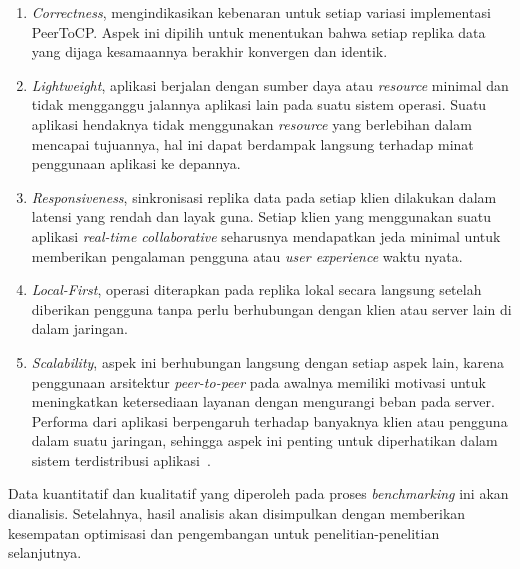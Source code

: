 \begin{enumerate}
    \item \textit{Correctness}, mengindikasikan kebenaran untuk setiap variasi implementasi PeerToCP. Aspek ini dipilih untuk menentukan bahwa setiap replika data yang dijaga kesamaannya berakhir konvergen dan identik.
    \item \textit{Lightweight}, aplikasi berjalan dengan sumber daya atau \textit{resource} minimal dan tidak mengganggu jalannya aplikasi lain pada suatu sistem operasi. Suatu aplikasi hendaknya tidak menggunakan \textit{resource} yang berlebihan dalam mencapai tujuannya, hal ini dapat berdampak langsung terhadap minat penggunaan aplikasi ke depannya.
    \item \textit{Responsiveness}, sinkronisasi replika data pada setiap klien dilakukan dalam latensi yang rendah dan layak guna. Setiap klien yang menggunakan suatu aplikasi \textit{real-time collaborative} seharusnya mendapatkan jeda minimal untuk memberikan pengalaman pengguna atau \textit{user experience} waktu nyata.
    \item \textit{Local-First}, operasi diterapkan pada replika lokal secara langsung setelah diberikan pengguna tanpa perlu berhubungan dengan klien atau server lain di dalam jaringan.
    \item \textit{Scalability}, aspek ini berhubungan langsung dengan setiap aspek lain, karena penggunaan arsitektur \textit{peer-to-peer} pada awalnya memiliki motivasi untuk meningkatkan ketersediaan layanan dengan mengurangi beban pada server. Performa dari aplikasi berpengaruh terhadap banyaknya klien atau pengguna dalam suatu jaringan, sehingga aspek ini penting untuk diperhatikan dalam sistem terdistribusi aplikasi~\citep{leibnitz2007peer}.
\end{enumerate}

Data kuantitatif dan kualitatif yang diperoleh pada proses \textit{benchmarking} ini akan dianalisis. Setelahnya, hasil analisis akan disimpulkan dengan memberikan kesempatan optimisasi dan pengembangan untuk penelitian-penelitian selanjutnya.
